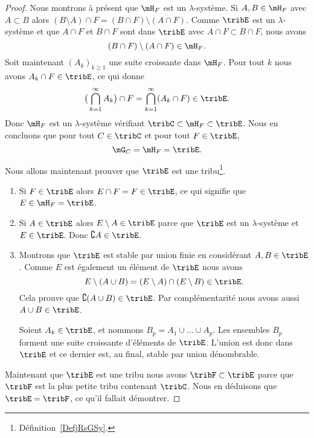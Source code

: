 \begin{proof}
	Nous montrons à présent que \( \mH_F\) est un \( \lambda\)-système. Si \( A,B\in\mH_F\) avec \( A\subset B\) alors \( (B\setminus A)\cap F=(B\cap F)\setminus(A\cap F)\). Comme \( \tribE\) est un \( \lambda\)-système et que \( A\cap F\) et \( B\cap F\) sont dans \( \tribE\) avec \( A\cap F\subset B\cap F\), nous avons
	\begin{equation}
		(B\cap F)\setminus(A\cap F)\in\mH_F.
	\end{equation}
	Soit maintenant \( (A_k)_{k\geq 1}\) une suite croissante dans \( \mH_F\). Pour tout \( k\) nous avons \( A_k\cap F\in\tribE\), ce qui donne
	\begin{equation}
		\big( \bigcap_{k=1}^{\infty}A_k \big)\cap F=\bigcap_{k=1}^{\infty}(A_k\cap F)\in\tribE.
	\end{equation}
	Donc \( \mH_F\) est un \( \lambda\)-système vérifiant \( \tribC\subset\mH_F\subset\tribE\). Nous en concluons que pour tout \( C\in\tribC\) et pour tout \( F\in\tribE\),
	\begin{equation}
		\mG_C=\mH_F=\tribE.
	\end{equation}

	Nous allons maintenant prouver que \( \tribE\) est une tribu\footnote{Définition~\ref{DefjRsGSy}.}.
	\begin{enumerate}
		\item
		      Si \( F\in\tribE\) alors \( E\cap F=F\in\tribE\), ce qui signifie que \( E\in\mH_F=\tribE\).
		\item
		      Si \( A\in \tribE\) alors \( E\setminus A\in\tribE\) parce que \( \tribE\) est un \( \lambda\)-système et \( E\in\tribE\). Donc \( \complement A\in\tribE\).
		\item
		      Montrons que \( \tribE\) est stable par union finie en considérant \( A,B\in\tribE\). Comme \( E\) est également un élément de \( \tribE\) nous avons
		      \begin{equation}
			      E\setminus(A\cup B)=(E\setminus A)\cap(E\setminus B)\in\tribE.
		      \end{equation}
		      Cela prouve que \( \complement( A\cup B)\in \tribE\). Par complémentarité nous avons aussi \( A\cup B\in\tribE\).

		      Soient \( A_k\in\tribE\), et nommons \( B_p=A_1\cup\ldots\cup A_p\). Les ensembles \( B_p\) forment une suite croissante d'éléments de \( \tribE\). L'union est donc dans \( \tribE\) et ce dernier est, au final, stable par union dénombrable.
	\end{enumerate}
	Maintenant que \( \tribE\) est une tribu nous avons \( \tribF\subset\tribE\) parce que \( \tribF\) est la plus petite tribu contenant \( \tribC\). Nous en déduisons que \( \tribE=\tribF\), ce qu'il fallait démontrer.
\end{proof}

